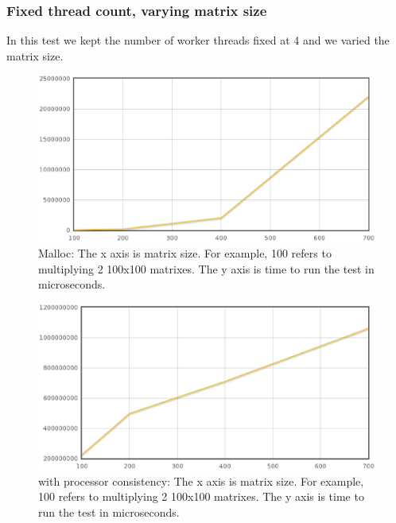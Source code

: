 \subsubsection{Fixed thread count, varying matrix size}

In this test we kept the number of worker threads fixed at 4 and we varied the matrix size.

\begin{figure}[!h]
\centering
\includegraphics[scale=0.40]{images/malloc-fixed-thread.eps}
\caption{Malloc: The x axis is matrix size. For example, 100 refers to multiplying 2 100x100 matrixes. The y axis is time to run the test in microseconds.}
\end{figure}

\begin{figure}[!h]
\centering
\includegraphics[scale=0.40]{images/mmult-lh-fixed-thread.eps}
\caption{\projname{} with processor consistency: The x axis is matrix size. For example, 100 refers to multiplying 2 100x100 matrixes. The y axis is time to run the test in microseconds.}
\end{figure}

